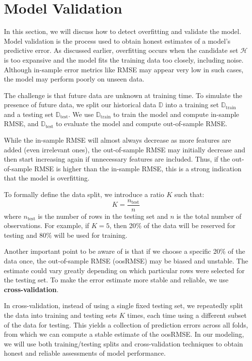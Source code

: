 \documentclass[12pt]{article}
\begin{document}
\section{Model Validation}

In this section, we will discuss how to detect overfitting and validate the model. Model validation is the process used to obtain honest estimates of a model's predictive error. As discussed earlier, overfitting occurs when the candidate set \( \mathcal{H} \) is too expansive and the model fits the training data too closely, including noise. Although in-sample error metrics like RMSE may appear very low in such cases, the model may perform poorly on unseen data.

The challenge is that future data are unknown at training time. To simulate the presence of future data, we split our historical data \( \mathbb{D} \) into a training set \( \mathbb{D}_{\text{train}} \) and a testing set \( \mathbb{D}_{\text{test}} \). We use \( \mathbb{D}_{\text{train}} \) to train the model and compute in-sample RMSE, and \( \mathbb{D}_{\text{test}} \) to evaluate the model and compute out-of-sample RMSE.

While the in-sample RMSE will almost always decrease as more features are added (even irrelevant ones), the out-of-sample RMSE may initially decrease and then start increasing again if unnecessary features are included. Thus, if the out-of-sample RMSE is higher than the in-sample RMSE, this is a strong indication that the model is overfitting.

To formally define the data split, we introduce a ratio \( K \) such that:
\[
K = \frac{n_{\text{test}}}{n}
\]
where \( n_{\text{test}} \) is the number of rows in the testing set and \( n \) is the total number of observations. For example, if \( K = 5 \), then 20\% of the data will be reserved for testing and 80\% will be used for training.

Another important point to be aware of is that if we choose a specific 20\% of the data once, the out-of-sample RMSE (oosRMSE) may be biased and unstable. The estimate could vary greatly depending on which particular rows were selected for the testing set. To make the error estimate more stable and reliable, we use \textbf{cross-validation}. 

In cross-validation, instead of using a single fixed testing set, we repeatedly split the data into training and testing sets \( K \) times, each time using a different subset of the data for testing. This yields a collection of prediction errors across all folds, from which we can compute a stable estimate of the oosRMSE. In our modeling, we will use both training/testing splits and cross-validation techniques to obtain honest and reliable assessments of model performance.
\end{document}
